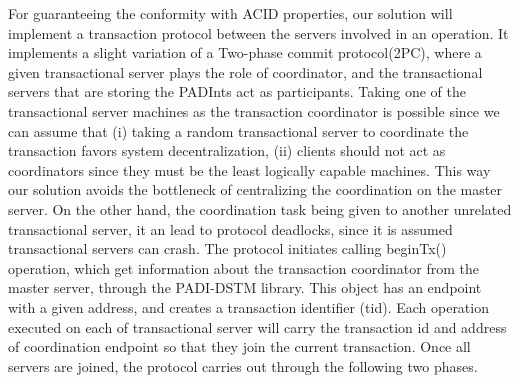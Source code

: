 \documentclass[times, 10pt,twocolumn]{article}
\begin{document}
For guaranteeing the conformity with ACID properties, our solution will implement a transaction protocol between the servers involved in an operation. It implements a slight variation of a Two-phase commit protocol(2PC), where a given transactional server plays the role of coordinator, and the transactional servers that are storing the PADInts act as participants. Taking one of the transactional server machines as the transaction coordinator is possible since we can assume that (i) taking a random transactional server to coordinate the transaction favors system decentralization, (ii) clients should not act as coordinators since they must be the least logically capable machines. This way our solution avoids the bottleneck of centralizing the coordination on the master server. On the other hand, the coordination task being given to another unrelated transactional server, it an lead to protocol deadlocks, since it is assumed transactional servers can crash.
The protocol initiates calling beginTx() operation, which get information about the transaction coordinator from the master server, through the PADI-DSTM library. This object has an endpoint with a given address, and creates a transaction identifier (tid). Each operation executed on each of transactional server will carry the transaction id and address of coordination endpoint so that they join the current transaction. Once all servers are joined, the protocol carries out through the following two phases.
\end{document}
